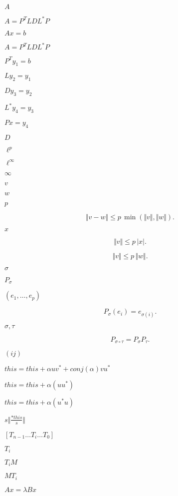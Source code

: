 \documentclass{article}
\begin{document}
$ A $
\pagebreak

$ A = P^TLDL^*P $
\pagebreak

$ A x = b $
\pagebreak

$ A = P^T L D L^* P $
\pagebreak

$ P^T y_1 = b $
\pagebreak

$ L y_2 = y_1 $
\pagebreak

$ D y_3 = y_2 $
\pagebreak

$ L^* y_4 = y_3 $
\pagebreak

$ P x = y_4 $
\pagebreak

$ D $
\pagebreak

$ \ell^p $
\pagebreak

$ \ell^\infty $
\pagebreak

$\infty$
\pagebreak

$ v $
\pagebreak

$ w $
\pagebreak

$ p $
\pagebreak

\[ \Vert v - w \Vert \leqslant p\,\min(\Vert v\Vert, \Vert w\Vert). \]
\pagebreak

$ x $
\pagebreak

\[ \Vert v \Vert \leqslant p\,\vert x\vert. \]
\pagebreak

\[ \Vert v \Vert \leqslant p\,\Vert w\Vert. \]
\pagebreak

$ \sigma $
\pagebreak

$ P_\sigma $
\pagebreak

$ (e_1,\ldots,e_p) $
\pagebreak

\[ P_\sigma(e_i) = e_{\sigma(i)}. \]
\pagebreak

$ \sigma, \tau $
\pagebreak

\[ P_{\sigma\circ\tau} = P_\sigma P_\tau. \]
\pagebreak

$(ij)$
\pagebreak

$ this = this + \alpha u v^* + conj(\alpha) v u^* $
\pagebreak

$ this = this + \alpha ( u u^* ) $
\pagebreak

$ this = this + \alpha ( u^* u ) $
\pagebreak

$ s \Vert \frac{*this}{s} \Vert $
\pagebreak

$[T_{n-1} \ldots T_{i} \ldots T_{0}]$
\pagebreak

$ T_{i} $
\pagebreak

$ T_{i} M$
\pagebreak

$ M T_{i}$
\pagebreak

$ Ax = \lambda B x $
\pagebreak
\end{document}
